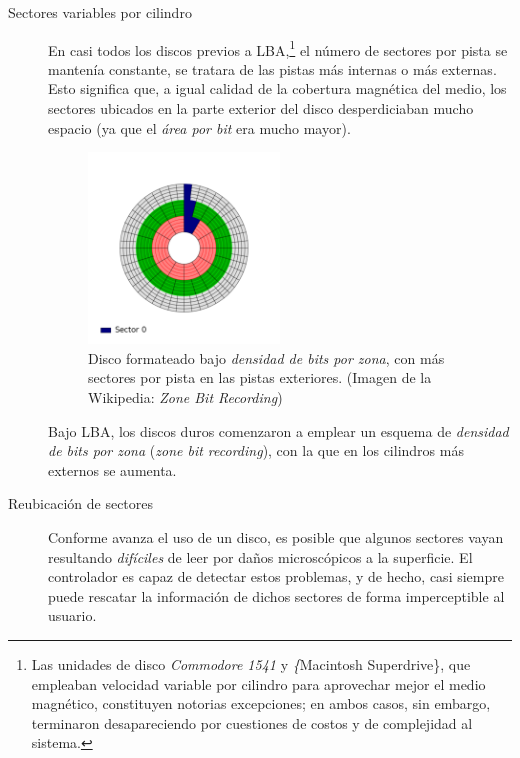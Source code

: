 \documentclass[11pt,fleqn]{book} %
\begin{document}
\begin{description}
\item[Sectores variables por cilindro] En casi todos los discos previos
     a LBA,\footnote{Las unidades de disco \emph{Commodore 1541} y \emph\{Macintosh
     Superdrive\}, que empleaban velocidad variable por cilindro para
     aprovechar mejor el medio magnético, constituyen notorias
     excepciones; en ambos casos, sin embargo, terminaron
     desapareciendo por cuestiones de costos y de complejidad al
     sistema. } el número de sectores por pista se mantenía constante,
     se tratara de las pistas más internas o más externas. Esto
     significa que, a igual calidad de la cobertura magnética del
     medio, los sectores ubicados en la parte exterior del disco
     desperdiciaban mucho espacio (ya que el \emph{área por bit} era mucho
     mayor).

     \begin{figure}[htb]
     \centering
     \includegraphics[width=0.5\textwidth]{./img/zone_bit_recording.png}
     \caption{\label{FS_FIS_zone_bit_recording}Disco formateado bajo \emph{densidad de bits por zona}, con más sectores por pista en las pistas exteriores. (Imagen de la Wikipedia: \emph{Zone Bit Recording})}
     \end{figure}

     Bajo LBA, los discos duros comenzaron a emplear un esquema de
     \emph{densidad de bits por zona} (\emph{zone bit recording}), con la que en
     los cilindros más externos se aumenta.
\item[Reubicación de sectores] Conforme avanza el uso de un disco, es
     posible que algunos sectores vayan resultando \emph{difíciles} de
     leer por daños microscópicos a la superficie. El controlador es
     capaz de detectar estos problemas, y de hecho, casi siempre
     puede rescatar la información de dichos sectores de forma
     imperceptible al usuario.


\end{description}
\end{document}
